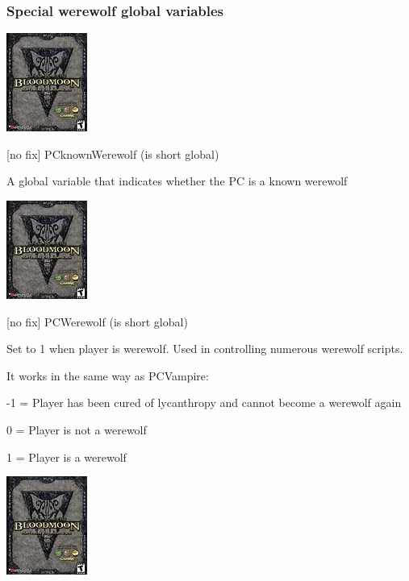 \documentclass[
]{article}
\begin{document}
\hypertarget{section-9}{%
\subsubsection{}\label{section-9}}

\hypertarget{section-10}{%
\subsubsection{}\label{section-10}}

\hypertarget{special-werewolf-global-variables}{%
\subsubsection{Special werewolf global
variables}\label{special-werewolf-global-variables}}

\includegraphics{media/image7.png}

{[}no fix{]} PCknownWerewolf (is short global)

A global variable that indicates whether the PC is a known werewolf

\includegraphics{media/image7.png}

{[}no fix{]} PCWerewolf (is short global)

Set to 1 when player is werewolf. Used in controlling numerous werewolf
scripts.

It works in the same way as PCVampire:

-1 = Player has been cured of lycanthropy and cannot become a werewolf
again

0 = Player is not a werewolf

1 = Player is a werewolf

\includegraphics{media/image7.png}
\end{document}
